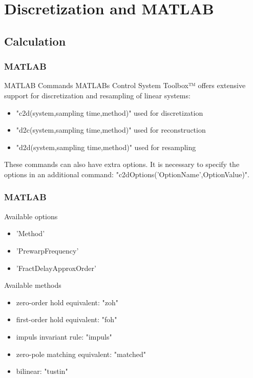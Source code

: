 \section{Discretization and MATLAB}
\subsection{Calculation}
\begin{frame}
	\frametitle{MATLAB}
	\begin{block}{MATLAB Commands}
		MATLABs Control System Toolbox™ offers extensive support for discretization and resampling of linear systems:
	\begin{itemize}
		\item "c2d(system,sampling time,method)" used for discretization
		\item "d2c(system,sampling time,method)" used for reconstruction
		\item "d2d(system,sampling time,method)" used for resampling
	\end{itemize}
	\vspace{1em}
		These commands can also have extra options. It is necessary to specify the options in an additional command:
		"c2dOptions('OptionName',OptionValue)".
	\end{block}
\end{frame}

\begin{frame}
	\frametitle{MATLAB}
	\begin{block}{Available options}
		\begin{itemize}
			\item 'Method'
			\item 'PrewarpFrequency'
			\item 'FractDelayApproxOrder'
		\end{itemize}
	\end{block}
	
	\begin{block}{Available methods}
		\begin{itemize}
			\item zero-order hold equivalent: "zoh"
			\item first-order hold equivalent: "foh"
			\item impuls invariant rule: "impuls"
			\item zero-pole matching equivalent: "matched"
			\item bilinear: "tustin"
		\end{itemize}
	\end{block}
\end{frame}

